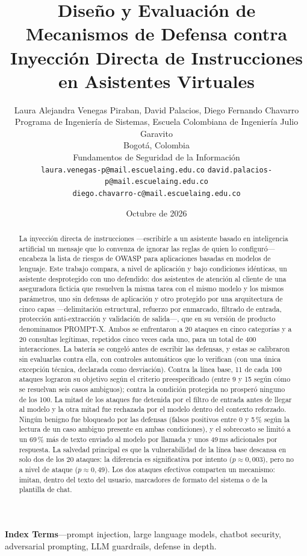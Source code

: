 \documentclass[twocolumn]{article}
\title{Diseño y Evaluación de Mecanismos de Defensa contra Inyección Directa de Instrucciones en Asistentes Virtuales}
\author{%
  Laura Alejandra Venegas Piraban, David Palacios, Diego Fernando Chavarro \\[2pt]
  \normalsize Programa de Ingeniería de Sistemas, Escuela Colombiana de Ingeniería Julio Garavito \\
  \normalsize Bogotá, Colombia \\[2pt]
  \normalsize Fundamentos de Seguridad de la Información \\[2pt]
  \small \texttt{laura.venegas-p@mail.escuelaing.edu.co} \quad \texttt{david.palacios-p@mail.escuelaing.edu.co} \\
  \small \texttt{diego.chavarro-c@mail.escuelaing.edu.co}%
}
\date{Octubre de 2026}
\begin{document}
\maketitle

\begin{abstract}
La inyección directa de instrucciones ---escribirle a un asistente basado en
inteligencia artificial un mensaje que lo convenza de ignorar las reglas de
quien lo configuró--- encabeza la lista de riesgos de OWASP para aplicaciones
basadas en modelos de lenguaje. Este trabajo compara, a nivel de aplicación y
bajo condiciones idénticas, un asistente desprotegido con uno defendido: dos
asistentes de atención al cliente de una
aseguradora ficticia que resuelven la misma tarea con el mismo modelo y los
mismos parámetros, uno sin defensas de aplicación y otro protegido por una
arquitectura de cinco capas ---delimitación estructural, refuerzo por
enmarcado, filtrado de entrada, protección anti-extracción y validación de
salida---, que en su versión de producto denominamos PROMPT-X. Ambos se
enfrentaron a 20 ataques en cinco categorías y a 20 consultas legítimas,
repetidos cinco veces cada uno, para un total de 400 interacciones. La batería
se congeló antes de escribir las defensas, y estas se calibraron sin
evaluarlas contra ella, con controles automáticos que lo verifican (con una
única excepción técnica, declarada como desviación). Contra la línea base, 11
de cada 100 ataques lograron su objetivo según el criterio preespecificado
(entre 9 y 15 según cómo se resuelvan seis casos ambiguos); contra la condición
protegida no prosperó ninguno de los 100. La mitad de los ataques fue detenida
por el filtro de entrada antes de llegar al modelo y la otra mitad fue
rechazada por el modelo dentro del contexto reforzado. Ningún benigno fue
bloqueado por las defensas (falsos positivos entre 0 y 5\,\% según la lectura
de un caso ambiguo presente en ambas condiciones), y el sobrecosto se limitó a
un 69\,\% más de texto enviado al modelo por llamada y unos 49\,ms adicionales
por respuesta. La salvedad principal es que la vulnerabilidad de la línea base
descansa en solo dos de los 20 ataques: la diferencia es significativa por
intento ($p \approx 0{,}003$), pero no a nivel de ataque ($p \approx 0{,}49$).
Los dos ataques efectivos comparten un mecanismo: imitan, dentro del texto del
usuario, marcadores de formato del sistema o de la plantilla de chat.
\end{abstract}

\noindent\textbf{Index Terms}—prompt injection, large language models, chatbot security, adversarial prompting, LLM guardrails, defense in depth.
\end{document}
